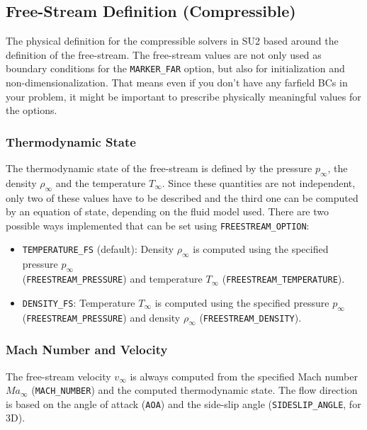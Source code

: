 \documentclass[12pt, a4paper, twoside]{article}
\begin{document}
\subsection{Free-Stream Definition (Compressible)}
	The physical definition for the compressible solvers in SU2 based around the definition of the free-stream. The free-stream values are not only used as boundary conditions for the \verb|MARKER_FAR| option, but also for initialization and non-dimensionalization. That means even if you don’t have any farfield BCs in your problem, it might be important to prescribe physically meaningful values for the options.

\subsubsection{Thermodynamic State}

The thermodynamic state of the free-stream is defined by the pressure \(p_\infty\), the density \(\rho_\infty\) and the temperature \(T_\infty\). Since these quantities are not independent, only two of these values have to be described and the third one can be computed by an equation of state, depending on the fluid model used. There are two possible ways implemented that can be set using \verb|FREESTREAM_OPTION|:

\begin{itemize}
    \item \verb|TEMPERATURE_FS| (default): Density \(\rho_\infty\) is computed using the specified pressure \(p_\infty\) \\(\verb|FREESTREAM_PRESSURE|) and temperature \(T_\infty\) (\verb|FREESTREAM_TEMPERATURE|).
    \item \verb|DENSITY_FS|: Temperature \(T_\infty\) is computed using the specified pressure \(p_\infty\) \\ (\verb|FREESTREAM_PRESSURE|) and density \(\rho_\infty\) (\verb|FREESTREAM_DENSITY|).
\end{itemize}


\subsubsection{Mach Number and Velocity}

The free-stream velocity \(v_\infty\) is always computed from the specified Mach number \(Ma_\infty\)  (\verb|MACH_NUMBER|) and the computed thermodynamic state. The flow direction is based on the angle of attack (\verb|AOA|) and the side-slip angle (\verb|SIDESLIP_ANGLE|, for 3D).
\end{document}
